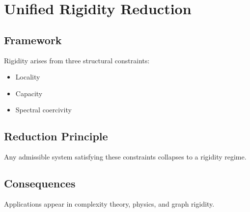 \chapter{Unified Rigidity Reduction}

\section{Framework}

Rigidity arises from three structural constraints:

\begin{itemize}
\item Locality
\item Capacity
\item Spectral coercivity
\end{itemize}

\section{Reduction Principle}

Any admissible system satisfying these constraints collapses to a rigidity regime.

\section{Consequences}

Applications appear in complexity theory, physics, and graph rigidity.

